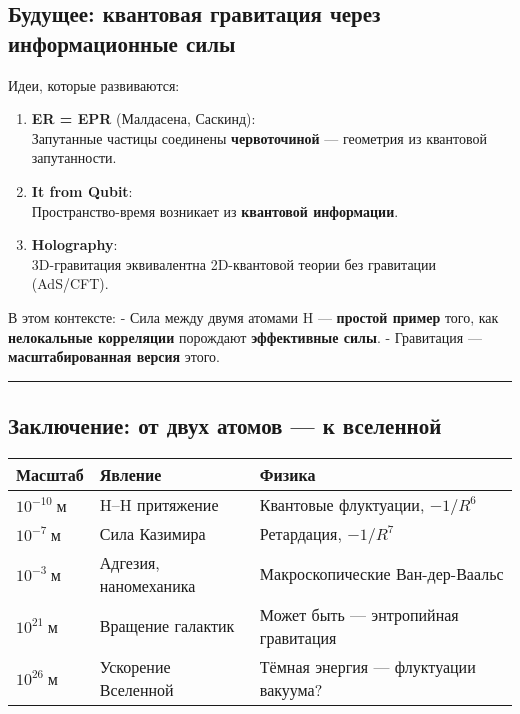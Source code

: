 \documentclass[11pt]{article}
\begin{document}
\subsection{\texorpdfstring{Будущее: квантовая гравитация через
\textbf{информационные
силы}}{Будущее: квантовая гравитация через информационные силы}}\label{ux431ux443ux434ux443ux449ux435ux435-ux43aux432ux430ux43dux442ux43eux432ux430ux44f-ux433ux440ux430ux432ux438ux442ux430ux446ux438ux44f-ux447ux435ux440ux435ux437-ux438ux43dux444ux43eux440ux43cux430ux446ux438ux43eux43dux43dux44bux435-ux441ux438ux43bux44b}

Идеи, которые развиваются:

\begin{enumerate}
\def\labelenumi{\arabic{enumi}.}
\item
  \textbf{ER = EPR} (Малдасена, Саскинд):\\
  Запутанные частицы соединены \textbf{червоточиной} --- геометрия из
  квантовой запутанности.
\item
  \textbf{It from Qubit}:\\
  Пространство-время возникает из \textbf{квантовой информации}.
\item
  \textbf{Holography}:\\
  3D-гравитация эквивалентна 2D-квантовой теории без гравитации
  (AdS/CFT).
\end{enumerate}

В этом контексте: - Сила между двумя атомами H --- \textbf{простой
пример} того, как \textbf{нелокальные корреляции} порождают
\textbf{эффективные силы}. - Гравитация --- \textbf{масштабированная
версия} этого.

\begin{center}\rule{0.5\linewidth}{\linethickness}\end{center}

\subsection{Заключение: от двух атомов --- к
вселенной}\label{ux437ux430ux43aux43bux44eux447ux435ux43dux438ux435-ux43eux442-ux434ux432ux443ux445-ux430ux442ux43eux43cux43eux432-ux43a-ux432ux441ux435ux43bux435ux43dux43dux43eux439}

\begin{longtable}[]{@{}lll@{}}
\toprule
Масштаб & Явление & Физика\tabularnewline
\midrule
\endhead
\(10^{-10}~\text{м}\) & H--H притяжение & Квантовые флуктуации,
\(-1/R^6\)\tabularnewline
\(10^{-7}~\text{м}\) & Сила Казимира & Ретардация,
\(-1/R^7\)\tabularnewline
\(10^{-3}~\text{м}\) & Адгезия, наномеханика & Макроскопические
Ван-дер-Ваальс\tabularnewline
\(10^{21}~\text{м}\) & Вращение галактик & Может быть --- энтропийная
гравитация\tabularnewline
\(10^{26}~\text{м}\) & Ускорение Вселенной & Тёмная энергия ---
флуктуации вакуума?\tabularnewline
\bottomrule
\end{longtable}
\end{document}
